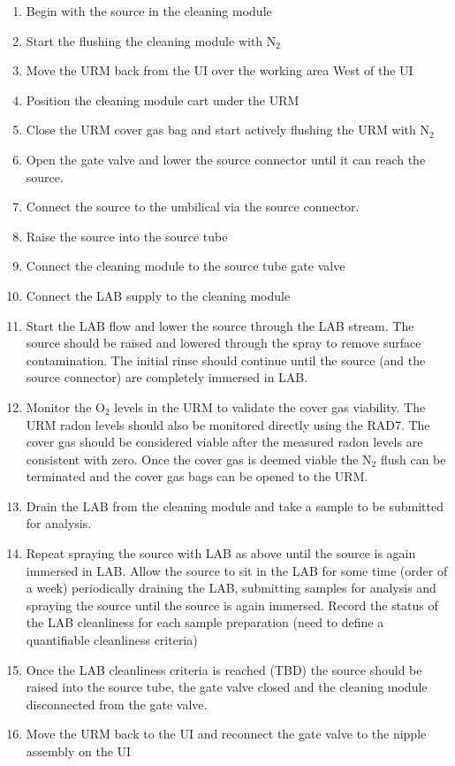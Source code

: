 \begin{enumerate}
\item Begin with the source in the cleaning module
\item Start the flushing the cleaning module with N$_{2}$ 
\item Move the URM back from the UI over the working area West of the UI
\item Position the cleaning module cart under the URM
\item Close the URM cover gas bag and start actively flushing the URM with N$_{2}$
\item Open the gate valve and lower the source connector until it can reach the source.
\item Connect the source to the umbilical via the source connector. 
\item Raise the source into the source tube
\item Connect the cleaning module to the source tube gate valve
\item Connect the LAB supply to the cleaning module
\item Start the LAB flow and lower the source through the LAB stream. The source should be  raised and lowered through the spray to remove surface contamination. The initial rinse should continue until the source (and the source connector) are completely immersed in LAB.
\item Monitor the O$_2$ levels in the URM to validate the cover gas viability. The URM radon levels should also be monitored directly using the RAD7. The cover gas should be considered viable after the measured radon levels are consistent with zero. Once the cover gas is deemed viable the N$_{2}$ flush can be terminated and the cover gas bags can be opened to the URM. 
\item Drain the LAB from the cleaning module and take a sample to be submitted for analysis.
\item Repeat spraying the source with LAB as above until the source is again immersed in LAB. Allow the source to sit in the LAB for some time (order of a week) periodically draining the LAB, submitting samples for analysis and spraying the source until the source is again immersed. Record the status of the LAB cleanliness for each sample preparation (need to define a quantifiable cleanliness criteria)
\item Once the LAB cleanliness criteria is reached (TBD) the source should be raised into the source tube, the gate valve closed and the cleaning module disconnected from the gate valve. 
\item Move the URM back to the UI and reconnect the gate valve to the nipple assembly on the UI
\end{enumerate}
